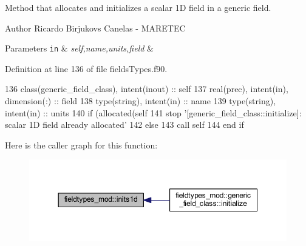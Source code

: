 Method that allocates and initializes a scalar 1D field in a generic field. 

\begin{DoxyAuthor}{Author}
Ricardo Birjukovs Canelas -\/ M\+A\+R\+E\+T\+EC 
\end{DoxyAuthor}

\begin{DoxyParams}[1]{Parameters}
\mbox{\tt in}  & {\em self,name,units,field} & \\
\hline
\end{DoxyParams}


Definition at line 136 of file fields\+Types.\+f90.


\begin{DoxyCode}
136     \textcolor{keywordtype}{class}(generic\_field\_class), \textcolor{keywordtype}{intent(inout)} :: self
137     \textcolor{keywordtype}{real(prec)}, \textcolor{keywordtype}{intent(in)}, \textcolor{keywordtype}{dimension(:)} :: field
138     \textcolor{keywordtype}{type}(string), \textcolor{keywordtype}{intent(in)} :: name
139     \textcolor{keywordtype}{type}(string), \textcolor{keywordtype}{intent(in)} :: units
140     \textcolor{keywordflow}{if} (\textcolor{keyword}{allocated}(self%
141         stop \textcolor{stringliteral}{'[generic\_field\_class::initialize]: scalar 1D field already allocated'}
142     \textcolor{keywordflow}{else}
143         \textcolor{keyword}{call }self%
144 \textcolor{keywordflow}{    end if}
\end{DoxyCode}
Here is the caller graph for this function\+:\nopagebreak
\begin{figure}[H]
\begin{center}
\leavevmode
\includegraphics[width=350pt]{namespacefieldtypes__mod_a3f1571ad15733a3f2fff43e35f309416_icgraph}
\end{center}
\end{figure}
\mbox{\label{namespacefieldtypes__mod_ad3329e97ec60bf9226d19be45ed21859}} 
